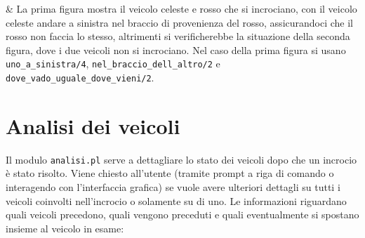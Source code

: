 \begin{center}
\begin{longtabu}
		 & La prima figura mostra il veicolo celeste e rosso che si incrociano, con il veicolo celeste andare a sinistra nel braccio di provenienza del rosso, assicurandoci che il rosso non faccia lo stesso, altrimenti si verificherebbe la situazione della seconda figura, dove i due veicoli non si incrociano. Nel caso della prima figura si usano \texttt{uno\_a\_sinistra/4}, \texttt{nel\_braccio\_dell\_altro/2} e \texttt{dove\_vado\_uguale\_dove\_vieni/2}.
	\end{longtabu}
\end{center}

\section{Analisi dei veicoli}
\label{sec:an}
Il modulo \texttt{analisi.pl} serve a dettagliare lo stato dei veicoli dopo che un incrocio è stato risolto. Viene chiesto all'utente (tramite prompt a riga di comando o interagendo con l'interfaccia grafica) se vuole avere ulteriori dettagli su tutti i veicoli coinvolti nell'incrocio o solamente su di uno. Le informazioni riguardano quali veicoli precedono, quali vengono preceduti e quali eventualmente si spostano insieme al veicolo in esame:

